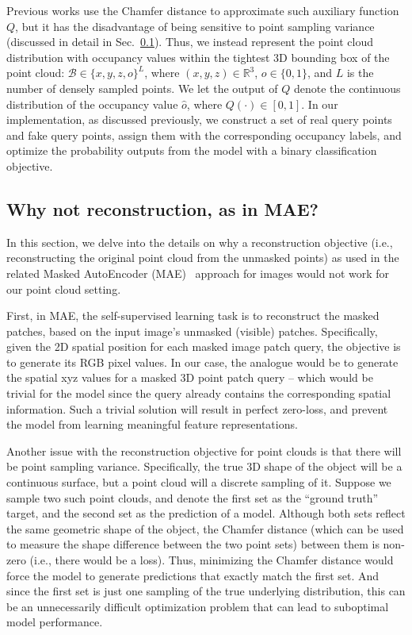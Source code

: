 \documentclass[runningheads]{llncs}
\begin{document}
Previous works use the Chamfer distance to approximate such auxiliary function $Q$, but it has the disadvantage of being sensitive to point sampling variance (discussed in detail in Sec.~\ref{sec:why_not}).  Thus, we instead represent the point cloud distribution with occupancy values within the tightest 3D bounding box of the point cloud:
$\mathcal{B} \in \{x,y,z,o\}^{L}$, where $(x,y,z) \in \mathbb{R}^3$, $o \in \{0, 1\}$, and $L$ is the number of densely sampled points. We let the output of $Q$ denote the continuous distribution of the occupancy value $\hat{o}$, where $Q(\cdot) \in [0, 1]$.
In our implementation, as discussed previously, we construct a set of real query points and fake query points, assign them with the corresponding occupancy labels, and optimize the probability outputs from the model with a binary classification objective.

\subsection{Why not reconstruction, as in MAE?}
\label{sec:why_not}

In this section, we delve into the details on why a reconstruction objective (i.e., reconstructing the original point cloud from the unmasked points) as used in the related Masked AutoEncoder (MAE)~\cite{mae} approach for images would not work for our point cloud setting.  

First, in MAE, the self-supervised learning task is to reconstruct the masked patches, based on the input image's unmasked (visible) patches.  Specifically, given the 2D spatial position for each masked image patch query, the objective is to generate its RGB pixel values. In our case, the analogue would be to generate the spatial xyz values for a masked 3D point patch query -- which would be trivial for the model since the query already contains the corresponding spatial information.  Such a trivial solution will result in perfect zero-loss, and prevent the model from learning meaningful feature representations.

Another issue with the reconstruction objective for point clouds is that there will be point sampling variance. Specifically, the true 3D shape of the object will be a continuous surface, but a point cloud will a discrete sampling of it.  Suppose we sample two such point clouds, and denote the first set as the ``ground truth'' target, and the second set as the prediction of a model.  Although both sets reflect the same geometric shape of the object, the Chamfer distance (which can be used to measure the shape difference between the two point sets) between them is non-zero (i.e., there would be a loss).  Thus, minimizing the Chamfer distance would force the model to generate predictions that exactly match the first set.  And since the first set is just one sampling of the true underlying distribution, this can be an unnecessarily difficult optimization problem that can lead to suboptimal model performance. 
\end{document}
